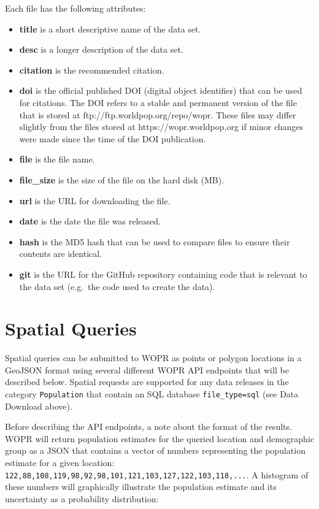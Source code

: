 \documentclass[]{book}
\begin{document}
 Each file has the following attributes:

\begin{itemize}
\item
  \textbf{title} is a short descriptive name of the data set.
\item
  \textbf{desc} is a longer description of the data set.
\item
  \textbf{citation} is the recommended citation.
\item
  \textbf{doi} is the official published DOI (digital object identifier)
  that can be used for citations. The DOI refers to a stable and
  permanent version of the file that is stored at
  ftp://ftp.worldpop.org/repo/wopr. These files may differ slightly from
  the files stored at https://wopr.worldpop.org if minor changes were
  made since the time of the DOI publication.
\item
  \textbf{file} is the file name.
\item
  \textbf{file\_size} is the size of the file on the hard disk (MB).
\item
  \textbf{url} is the URL for downloading the file.
\item
  \textbf{date} is the date the file was released.
\item
  \textbf{hash} is the MD5 hash that can be used to compare files to
  ensure their contents are identical.
\item
  \textbf{git} is the URL for the GitHub repository containing code that
  is relevant to the data set (e.g.~the code used to create the data).
\end{itemize}

\section{Spatial Queries}\label{spatial-queries}

Spatial queries can be submitted to WOPR as points or polygon locations
in a GeoJSON format using several different WOPR API endpoints that will
be described below. Spatial requests are supported for any data releases
in the category \texttt{\textquotesingle{}Population\textquotesingle{}}
that contain an SQL database
\texttt{file\_type=\textquotesingle{}sql\textquotesingle{}} (see Data
Download above).

Before describing the API endpoints, a note about the format of the
results. WOPR will return population estimates for the queried location
and demographic group as a JSON that contains a vector of numbers
representing the population estimate for a given location:
\texttt{122,88,108,119,98,92,98,101,121,103,127,122,103,118,...}. A
histogram of these numbers will graphically illustrate the population
estimate and its uncertainty as a probability distribution:
\end{document}
